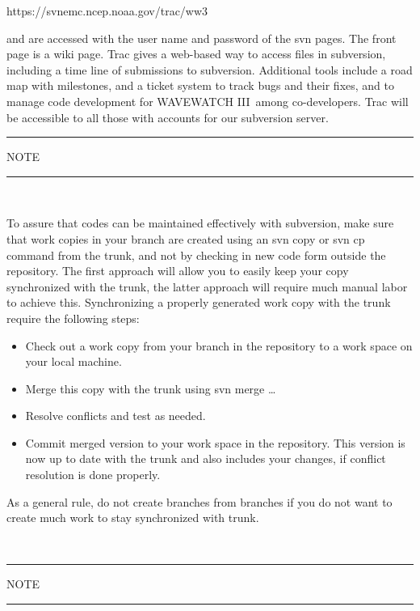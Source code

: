 \documentclass[12pt]{article}
\newcommand{\ww}{WAVEWATCH III}
\newcommand{\file}{\sf}
\newcommand{\pb}{\strut \vfill \pagebreak}
\begin{document}
\vspace{\baselineskip}
\centerline{\file https://svnemc.ncep.noaa.gov/trac/ww3}
\vspace{\baselineskip}

\noindent
and are accessed with the user name and password of the svn pages. The front
page is a wiki page. Trac gives a web-based way to access files in subversion,
including a time line of submissions to subversion. Additional tools include a
road map with milestones, and a ticket system to track bugs and their fixes,
and to manage code development for \ww\ among co-developers.  Trac will be
accessible to all those with accounts for our subversion server.

\pb

\begin{center}
\rule[1mm]{55mm}{1.0mm} NOTE \rule[1mm]{55mm}{1.0mm} \\ 
\vspace{\baselineskip} \label{svn_n}
\parbox{120mm}{To assure that codes can be maintained effectively with
  subversion, make sure that work copies in your branch are created using an
  {\file svn copy} or {\file svn cp} command from the trunk, and not by
  checking in new code form outside the repository. The first approach will
  allow you to easily keep your copy synchronized with the trunk, the latter
  approach will require much manual labor to achieve this. Synchronizing a
  properly generated work copy with the trunk require the following steps:
\begin{itemize}
\item Check out a work copy from your branch in the repository to a work space
      on your local machine.
\item Merge this copy with the trunk using {\file svn merge \ldots}
\item Resolve conflicts and test as needed.
\item Commit merged version to your work space in the repository. This version
      is now up to date with the trunk and also includes your changes, if
      conflict resolution is done properly.
\end{itemize}
As a general rule, do not create branches from branches if you do not want to
create much work to stay synchronized with trunk.} \\
\vspace{\baselineskip} \rule[1mm]{55mm}{1.0mm} NOTE \rule[1mm]{55mm}{1.0mm}
\end{center}
\end{document}
